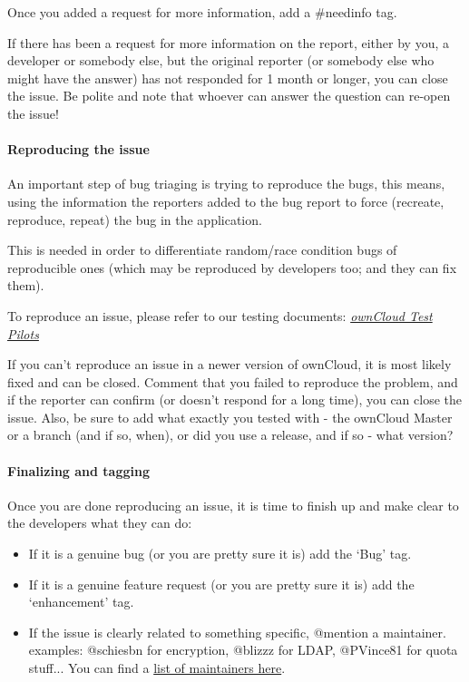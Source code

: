 \documentclass[letterpaper,10pt,english]{sphinxmanual}
\begin{document}
Once you added a request for more information, add a \#needinfo tag.

If there has been a request for more information on the report, either by you, a developer or somebody else, but the original reporter (or somebody else who might have the answer) has not responded for 1 month or longer, you can close the issue. Be polite and note that whoever can answer the question can re-open the issue!


\paragraph{Reproducing the issue}
\label{bugtracker/triaging:reproducing-the-issue}
An important step of bug triaging is trying to reproduce the bugs, this means, using the information the reporters added to the bug report to force (recreate, reproduce, repeat) the bug in the application.

This is needed in order to differentiate random/race condition bugs of reproducible ones (which may be reproduced by developers too; and they can fix them).

To reproduce an issue, please refer to our testing documents: {\hyperref[testing/index::doc]{\emph{\emph{ownCloud Test Pilots}}}}

If you can't reproduce an issue in a newer version of ownCloud, it is most likely fixed and can be closed. Comment that you failed to reproduce the problem, and if the reporter can confirm (or doesn't respond for a long time), you can close the issue. Also, be sure to add what exactly you tested with - the ownCloud Master or a branch (and if so, when), or did you use a release, and if so - what version?


\paragraph{Finalizing and tagging}
\label{bugtracker/triaging:finalizing-and-tagging}
Once you are done reproducing an issue, it is time to finish up and make clear to the developers what they can do:
\begin{itemize}
\item {} 
If it is a genuine bug (or you are pretty sure it is) add the `Bug' tag.

\item {} 
If it is a genuine feature request (or you are pretty sure it is) add the `enhancement' tag.

\item {} 
If the issue is clearly related to something specific, @mention a maintainer. examples: @schiesbn for encryption, @blizzz for LDAP, @PVince81 for quota stuff... You can find a \href{https://github.com/owncloud/core/wiki/Maintainers}{list of maintainers here}.

\end{itemize}
\end{document}
